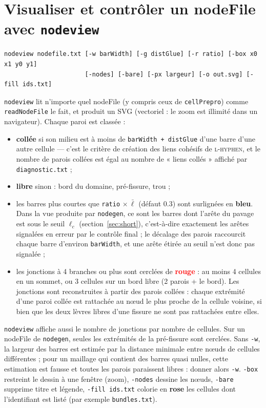 \documentclass[11pt,a4paper]{article}
\newcommand{\code}[1]{\texttt{#1}}
\newcommand{\toolgen}{\code{nodegen}}
\newcommand{\toolview}{\code{nodeview}}
\begin{document}
\section{Visualiser et contrôler un nodeFile avec \toolview}

\begin{lstlisting}
nodeview nodefile.txt [-w barWidth] [-g distGlue] [-r ratio] [-box x0 x1 y0 y1]
                      [-nodes] [-bare] [-px largeur] [-o out.svg] [-fill ids.txt]
\end{lstlisting}

\toolview{} lit n'importe quel nodeFile (y compris ceux de \code{cellPrepro}) comme \code{readNodeFile} le fait, et
produit un SVG (vectoriel : le zoom est illimité dans un navigateur). Chaque paroi est classée :
\begin{itemize}[nosep]
  \item \textcolor{glued}{\textbf{collée}} si son milieu est à moins de \code{barWidth + distGlue} d'une barre
    d'une autre cellule --- c'est le critère de création des liens cohésifs de \textsc{l-hyphen}, et le nombre de
    parois collées est égal au nombre de « liens collés » affiché par \code{diagnostic.txt} ;
  \item \textcolor{free}{\textbf{libre}} sinon : bord du domaine, pré-fissure, trou ;
  \item les barres plus courtes que \code{ratio} $\times\,\bar\ell$ (défaut 0.3) sont surlignées en
    \textcolor{short}{\textbf{bleu}}. Dans la vue produite par \toolgen, ce sont les barres dont l'arête du pavage
    est sous le seuil $\ell_c$ (section~\ref{sec:short}), c'est-à-dire exactement les arêtes signalées en erreur
    par le contrôle final ; le décalage des parois raccourcit chaque barre d'environ \code{barWidth}, et une arête
    étirée au seuil n'est donc pas signalée ;
  \item les jonctions à 4 branches ou plus sont cerclées de \textcolor{red}{\textbf{rouge}} : au moins 4
    cellules en un sommet, ou 3 cellules sur un bord libre (2 parois + le bord). Les jonctions sont reconstruites
    à partir des parois collées : chaque extrémité d'une paroi collée est rattachée au nœud le plus proche de la
    cellule voisine, si bien que les deux lèvres libres d'une fissure ne sont pas rattachées entre elles.
\end{itemize}
\toolview{} affiche aussi le nombre de jonctions par nombre de cellules. Sur un nodeFile de \toolgen, seules les
extrémités de la pré-fissure sont cerclées.
Sans \code{-w}, la largeur des barres est estimée par la distance minimale entre nœuds de cellules différentes ;
pour un maillage qui contient des barres quasi nulles, cette estimation est fausse et toutes les parois paraissent
libres : donner alors \code{-w}. \code{-box} restreint le dessin à une fenêtre (zoom), \code{-nodes} dessine les
nœuds, \code{-bare} supprime titre et légende, \code{-fill ids.txt} colorie en
\textcolor{bundle!80!black}{\textbf{rose}} les cellules dont l'identifiant est listé (par exemple
\code{bundles.txt}).
\end{document}
